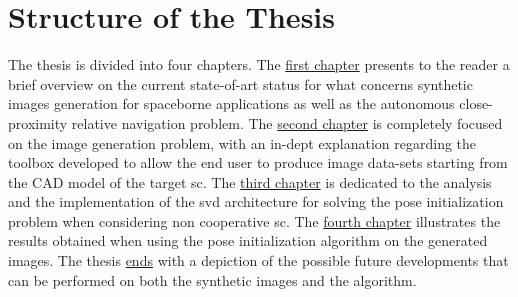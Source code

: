 \section{Structure of the Thesis}
The thesis is divided into four chapters. The \hyperref[chap:first-chapter]{first chapter} presents to the reader a brief overview on the current state-of-art status for what concerns synthetic images generation for spaceborne applications as well as the autonomous close-proximity relative navigation problem. The \hyperref[chap:second-chapter]{second chapter} is completely focused on the image generation problem, with an in-dept explanation regarding the toolbox developed to allow the end user to produce image data-sets starting from the CAD model of the target \acrshort{sc}. The \hyperref[chap:third-chapter]{third chapter} is dedicated to the analysis and the implementation of the \acrshort{svd} architecture for solving the pose initialization problem when considering non cooperative \acrshort{sc}. The \hyperref[chap:fourth-chapter]{fourth chapter} illustrates the results obtained when using the pose initialization algorithm on the generated images. The thesis \hyperref[chap:conclusions]{ends} with a depiction of the possible future developments that can be performed on both the synthetic images and the algorithm.